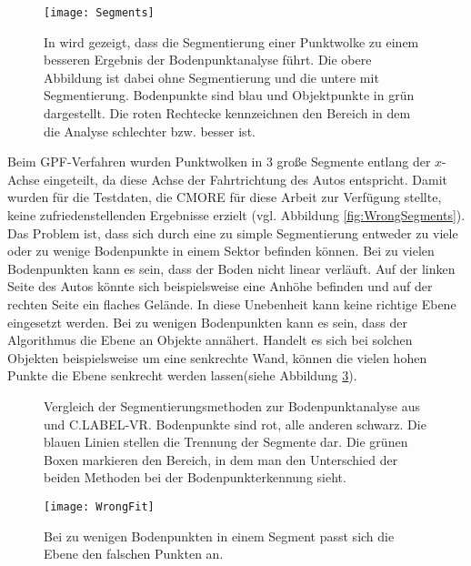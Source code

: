 \begin{figure}%
	\centering
    \texttt{[image: Segments]}
    \caption{In \cite{bib:Segmentation1} wird gezeigt, dass die Segmentierung einer Punktwolke zu einem besseren Ergebnis der Bodenpunktanalyse führt. Die obere Abbildung ist dabei ohne Segmentierung und die untere mit Segmentierung. Bodenpunkte sind blau und Objektpunkte in grün dargestellt. Die roten Rechtecke kennzeichnen den Bereich in dem die Analyse schlechter bzw. besser ist.}
    \label{fig:Segments}
\end{figure}

Beim GPF-Verfahren wurden Punktwolken in 3 große Segmente entlang der $x$-Achse eingeteilt, da diese Achse der Fahrtrichtung des Autos entspricht. Damit wurden für die Testdaten, die CMORE für diese Arbeit zur Verfügung stellte, keine zufriedenstellenden Ergebnisse erzielt (vgl. Abbildung \ref{fig:WrongSegments}). Das Problem ist, dass sich durch eine zu simple Segmentierung entweder zu viele oder zu wenige Bodenpunkte in einem Sektor befinden können. Bei zu vielen Bodenpunkten kann es sein, dass der Boden nicht linear verläuft. Auf der linken Seite des Autos könnte sich beispielsweise eine Anhöhe befinden und auf der rechten Seite ein flaches Gelände. In diese Unebenheit kann keine richtige Ebene eingesetzt werden. Bei zu wenigen Bodenpunkten kann es sein, dass der Algorithmus die Ebene an Objekte annähert. Handelt es sich bei solchen Objekten beispielsweise um eine senkrechte Wand, können die vielen hohen Punkte die Ebene senkrecht werden lassen(siehe Abbildung \ref{fig:WrongFit}).\\

\begin{figure}%
    \centering
    \qquad
    \caption{Vergleich der Segmentierungsmethoden zur Bodenpunktanalyse aus \cite{bib:Segmentation1} und C.LABEL-VR. Bodenpunkte sind rot, alle anderen schwarz. Die blauen Linien stellen die Trennung der Segmente dar. Die grünen Boxen markieren den Bereich, in dem man den Unterschied der beiden Methoden bei der Bodenpunkterkennung sieht.}\label{fig:Segmentation}%
\end{figure}

\begin{figure}%
	\centering
    \texttt{[image: WrongFit]}
    \caption{Bei zu wenigen Bodenpunkten in einem Segment passt sich die Ebene den falschen Punkten an.}
    \label{fig:WrongFit}
\end{figure}

